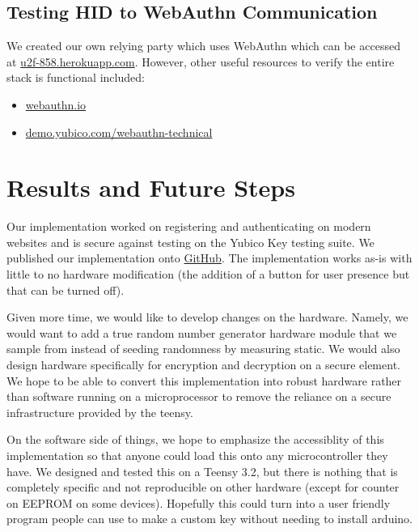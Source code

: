 \documentclass[acmtog,review]{acmart}
\begin{document}
\subsection{Testing HID to WebAuthn Communication}
We created our own relying party which uses WebAuthn which can be accessed at \href{https://u2f-858.herokuapp.com/}{u2f-858.herokuapp.com}. However, other useful
resources to verify the entire stack is functional included:
\begin{itemize}
  \item \href{https://webauthn.io/}{webauthn.io}
  \item \href{https://demo.yubico.com/webauthn-technical/registration}{demo.yubico.com/webauthn-technical}
\end{itemize}

\section{Results and Future Steps}

Our implementation worked on registering and authenticating on modern websites and
is secure against testing on the Yubico Key testing suite. We published our implementation
onto \href{https://www.github.com/tareqdandachi/u2f}{GitHub}. The implementation works as-is
with little to no hardware modification (the addition of a button for user presence but that
can be turned off).

Given more time, we would like to develop changes on the hardware. Namely, we would want to
add a true random number generator hardware module that we sample from instead of seeding
randomness by measuring static. We would also design hardware specifically for encryption
and decryption on a secure element. We hope to be able to convert this implementation into
robust hardware rather than software running on a microprocessor to remove the reliance
on a secure infrastructure provided by the teensy. 

On the software side of things, we hope to emphasize the accessiblity of this implementation
so that anyone could load this onto any microcontroller they have. We designed and tested this
on a Teensy 3.2, but there is nothing that is completely specific and not reproducible
on other hardware (except for counter on EEPROM on some devices). Hopefully this could
turn into a user friendly program people can use to make a custom key without needing
to install arduino.
\end{document}
